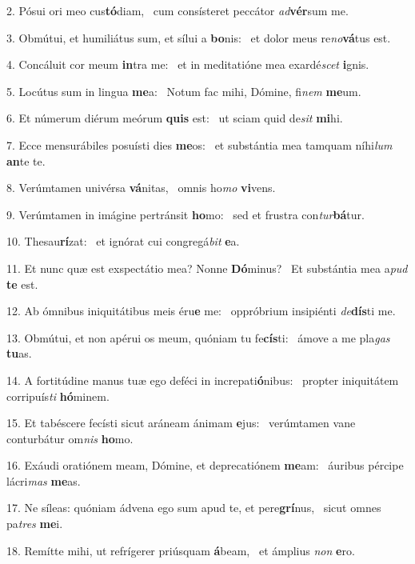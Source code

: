 2. Pósui ori meo cus\textbf{tó}diam, \ast\  cum consísteret peccátor \textit{ad}\textbf{vér}sum me.\

3. Obmútui, et humiliátus sum, et sílui a \textbf{bo}nis: \ast\  et dolor meus re\textit{no}\textbf{vá}tus est.\

4. Concáluit cor meum \textbf{in}tra me: \ast\  et in meditatióne mea exardé\textit{scet} \textbf{i}gnis.\

5. Locútus sum in lingua \textbf{me}a: \ast\  Notum fac mihi, Dómine, fi\textit{nem} \textbf{me}um.\

6. Et númerum diérum meórum \textbf{quis} est: \ast\  ut sciam quid de\textit{sit} \textbf{mi}hi.\

7. Ecce mensurábiles posuísti dies \textbf{me}os: \ast\  et substántia mea tamquam níhi\textit{lum} \textbf{an}te te.\

8. Verúmtamen univérsa \textbf{vá}nitas, \ast\  omnis ho\textit{mo} \textbf{vi}vens.\

9. Verúmtamen in imágine pertránsit \textbf{ho}mo: \ast\  sed et frustra con\textit{tur}\textbf{bá}tur.\

10. Thesau\textbf{rí}zat: \ast\  et ignórat cui congregá\textit{bit} \textbf{e}a.\

11. Et nunc quæ est exspectátio mea? Nonne \textbf{Dó}minus? \ast\  Et substántia mea a\textit{pud} \textbf{te} est.\

12. Ab ómnibus iniquitátibus meis éru\textbf{e} me: \ast\  oppróbrium insipiénti \textit{de}\textbf{dís}ti me.\

13. Obmútui, et non apérui os meum, quóniam tu fe\textbf{cís}ti: \ast\  ámove a me pla\textit{gas} \textbf{tu}as.\

14. A fortitúdine manus tuæ ego deféci in increpati\textbf{ó}nibus: \ast\  propter iniquitátem corripuís\textit{ti} \textbf{hó}minem.\

15. Et tabéscere fecísti sicut aráneam ánimam \textbf{e}jus: \ast\  verúmtamen vane conturbátur om\textit{nis} \textbf{ho}mo.\

16. Exáudi oratiónem meam, Dómine, et deprecatiónem \textbf{me}am: \ast\  áuribus pércipe lácri\textit{mas} \textbf{me}as.\

17. Ne síleas: quóniam ádvena ego sum apud te, et pere\textbf{grí}nus, \ast\  sicut omnes pa\textit{tres} \textbf{me}i.\

18. Remítte mihi, ut refrígerer priúsquam \textbf{á}beam, \ast\  et ámplius \textit{non} \textbf{e}ro.\

